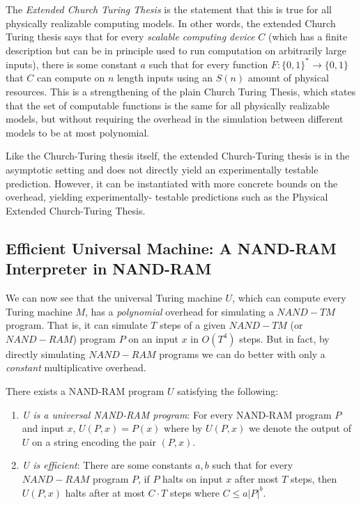   The \textit{Extended Church Turing Thesis} is the statement that this is true for all physically realizable computing models. In other words, the extended Church Turing thesis says that for every \textit{scalable computing device} $C$ (which has a finite description but can be in principle used to run computation on arbitrarily large inputs), there is some constant $a$ such that for every function $F: \{0,1\}^* \longrightarrow \{0,1\}$ that $C$ can compute on $n$ length inputs using an $S(n)$ amount of physical resources. This is a strengthening of the plain Church Turing Thesis, which states that the set of computable functions is the same for all physically realizable models, but without requiring the overhead in the simulation between different models to be at most polynomial. 

  Like the Church-Turing thesis itself, the extended Church-Turing thesis is in the asymptotic setting and does not directly yield an experimentally testable prediction. However, it can be instantiated with more concrete bounds on the overhead, yielding experimentally- testable predictions such as the Physical Extended Church-Turing Thesis. 
   
\subsection{Efficient Universal Machine: A NAND-RAM Interpreter in NAND-RAM}

  We can now see that the universal Turing machine $U$, which can compute every Turing machine $M$, has a \textit{polynomial} overhead for simulating a $NAND-TM$ program. That is, it can simulate $T$ steps of a given $NAND-TM$ (or $NAND-RAM$) program $P$ on an input $x$ in $O(T^4)$ steps. But in fact, by directly simulating $NAND-RAM$ programs we can do better with only a \textit{constant} multiplicative overhead. 

  \begin{theorem}
  There exists a NAND-RAM program $U$ satisfying the following: 
  \begin{enumerate}
      \item \textit{U is a universal NAND-RAM program}: For every NAND-RAM program $P$ and input $x$, $U(P, x) = P(x)$ where by $U(P, x)$ we denote the output of $U$ on a string encoding the pair $(P, x)$. 
      \item \textit{U is efficient}: There are some constants $a, b$ such that for every $NAND-RAM$ program $P$, if $P$ halts on input $x$ after most $T$ steps, then $U(P, x)$ halts after at most $C \cdot T$ steps where $C \leq a |P|^b$. 
  \end{enumerate}
  \end{theorem}

